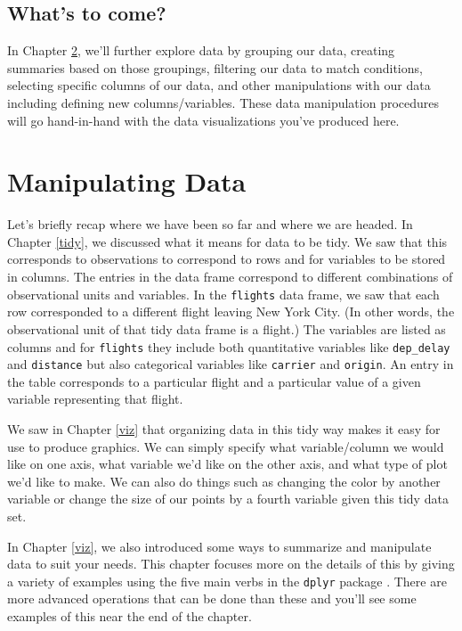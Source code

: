 \documentclass[]{tufte-book}
\begin{document}
\section{What's to come?}\label{whats-to-come-1}

In Chapter \ref{manip}, we'll further explore data by grouping our data,
creating summaries based on those groupings, filtering our data to match
conditions, selecting specific columns of our data, and other
manipulations with our data including defining new columns/variables.
These data manipulation procedures will go hand-in-hand with the data
visualizations you've produced here.

\chapter{Manipulating Data}\label{manip}

Let's briefly recap where we have been so far and where we are headed.
In Chapter \ref{tidy}, we discussed what it means for data to be tidy.
We saw that this corresponds to observations to correspond to rows and
for variables to be stored in columns. The entries in the data frame
correspond to different combinations of observational units and
variables. In the \texttt{flights} data frame, we saw that each row
corresponded to a different flight leaving New York City. (In other
words, the observational unit of that tidy data frame is a flight.) The
variables are listed as columns and for \texttt{flights} they include
both quantitative variables like \texttt{dep\_delay} and
\texttt{distance} but also categorical variables like \texttt{carrier}
and \texttt{origin}. An entry in the table corresponds to a particular
flight and a particular value of a given variable representing that
flight.

We saw in Chapter \ref{viz} that organizing data in this tidy way makes
it easy for use to produce graphics. We can simply specify what
variable/column we would like on one axis, what variable we'd like on
the other axis, and what type of plot we'd like to make. We can also do
things such as changing the color by another variable or change the size
of our points by a fourth variable given this tidy data set.

In Chapter \ref{viz}, we also introduced some ways to summarize and
manipulate data to suit your needs. This chapter focuses more on the
details of this by giving a variety of examples using the five main
verbs in the \texttt{dplyr} package \citep{R-dplyr}. There are more
advanced operations that can be done than these and you'll see some
examples of this near the end of the chapter.
\end{document}
